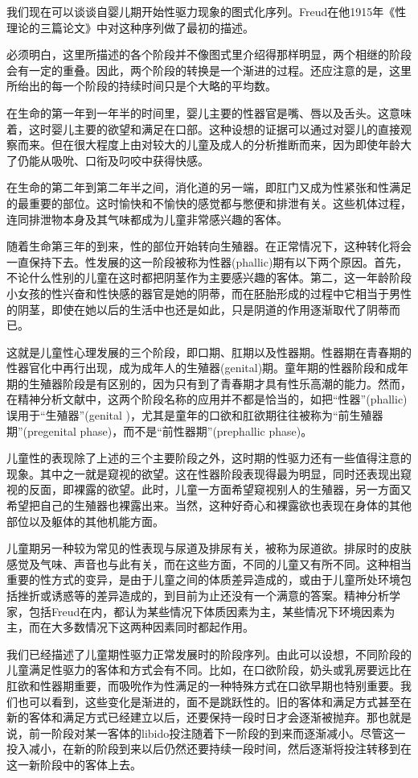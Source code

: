 \documentclass[UTF8,10pt,a4paper,openany]{book}
\begin{document}
我们现在可以谈谈自婴儿期开始性驱力现象的图式化序列。Freud在他1915年《性理论的三篇论文》中对这种序列做了最初的描述。

必须明白，这里所描述的各个阶段并不像图式里介绍得那样明显，两个相继的阶段会有一定的重叠。因此，两个阶段的转换是一个渐进的过程。还应注意的是，这里所绐出的每一个阶段的持续时间只是个大略的平均数。

在生命的第一年到一年半的时间里，婴儿主要的性器官是嘴、唇以及舌头。这意味着，这时婴儿主要的欲望和满足在口部。这种设想的证据可以通过对婴儿的直接观察而来。但在很大程度上由对较大的儿童及成人的分析推断而来，因为即使年龄大了仍能从吸吮、口衔及叼咬中获得快感。

在生命的第二年到第二年半之间，消化道的另一端，即肛门又成为性紧张和性满足的最重要的部位。这时愉快和不愉快的感觉都与憋便和排泄有关。这些机体过程，连同排泄物本身及其气味都成为儿童非常感兴趣的客体。

随着生命第三年的到来，性的部位开始转向生殖器。在正常情况下，这种转化将会一直保持下去。性发展的这一阶段被称为性器(phallic)期有以下两个原因。首先，不论什么性别的儿童在这时都把阴茎作为主要感兴趣的客体。第二，这一年龄阶段小女孩的性兴奋和性快感的器官是她的阴蒂，而在胚胎形成的过程中它相当于男性的阴茎，即使在她以后的生活中也还是如此，只是阴道的作用逐渐取代了阴蒂而已。

这就是儿童性心理发展的三个阶段，即口期、肛期以及性器期。性器期在青春期的性器官化中再行出现，成为成年人的生殖器(genital)期。童年期的性器阶段和成年期的生殖器阶段是有区别的，因为只有到了青春期才具有性乐高潮的能力。然而，在精神分析文献中，这两个阶段名称的应用并不都是恰当的，如把“性器”(phallic)误用于“生殖器”(genital )，尤其是童年的口欲和肛欲期往往被称为“前生殖器期”(pregenital phase)，而不是“前性器期”(prephallic phase)。

儿童性的表现除了上述的三个主要阶段之外，这时期的性驱力还有一些值得注意的现象。其中之一就是窥视的欲望。这在性器阶段表现得最为明显，同时还表现出窥视的反面，即裸露的欲望。此时，儿童一方面希望窥视别人的生殖器，另一方面又希望把自己的生殖器也裸露出来。当然，这种好奇心和裸露欲也表现在身体的其他部位以及躯体的其他机能方面。

儿童期另一种较为常见的性表现与尿道及排尿有关，被称为尿道欲。排尿时的皮肤感觉及气味、声音也与此有关，而在这些方面，不同的儿童又有所不同。这种相当重要的性方式的变异，是由于儿童之间的体质差异造成的，或由于儿童所处环境包括挫折或诱惑等的差异造成的，到目前为止还没有一个满意的答案。精神分析学家，包括Freud在内，都认为某些情况下体质因素为主，某些情况下环境因素为主，而在大多数情况下这两种因素同时都起作用。

我们已经描述了儿童期性驱力正常发展时的阶段序列。由此可以设想，不同阶段的儿童满足性驱力的客体和方式会有不同。比如，在口欲阶段，奶头或乳房要远比在肛欲和性器期重要，而吸吮作为性满足的一种特殊方式在口欲早期也特别重要。我们也可以看到，这些变化是渐进的，面不是跳跃性的。旧的客体和满足方式甚至在新的客体和满足方式已经建立以后，还要保持一段时日才会逐渐被抛弃。那也就是说，前一阶段对某一客体的libido投注随着下一阶段的到来而逐渐减小。尽管这一投入减小，在新的阶段到来以后仍然还要持续一段时间，然后逐渐将投注转移到在这一新阶段中的客体上去。
\end{document}
